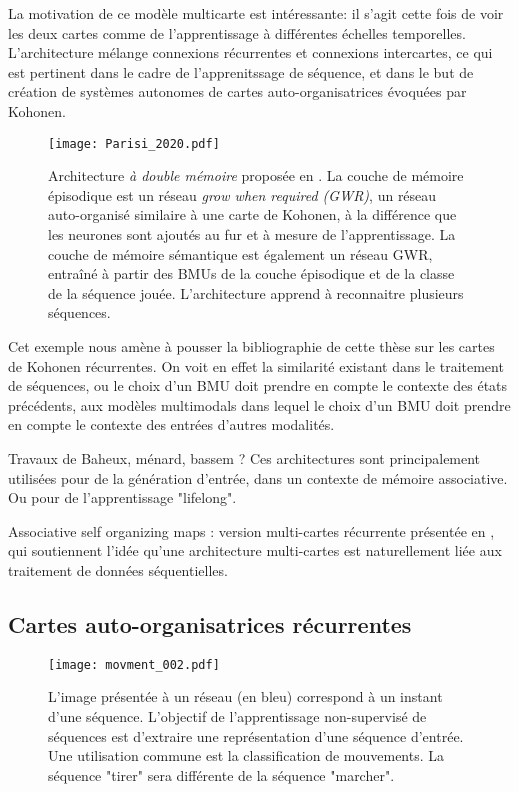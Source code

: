 \documentclass[../main]{subfiles}
\begin{document}
La motivation de ce modèle multicarte est intéressante: il s'agit cette fois de voir les deux cartes comme de l'apprentissage à différentes échelles temporelles. L'architecture mélange connexions récurrentes et connexions intercartes, ce qui est pertinent dans le cadre de l'apprenitssage de séquence, et dans le but de création de systèmes autonomes de cartes auto-organisatrices évoquées par Kohonen.


\begin{figure}
    \centering
    \texttt{[image: Parisi\_2020.pdf]}
    \caption{Architecture \emph{à double mémoire} proposée en \cite{parisiLL}. La couche de mémoire épisodique est un réseau \emph{grow when required (GWR)}, un réseau auto-organisé similaire à une carte de Kohonen, à la différence que les neurones sont ajoutés au fur et à mesure de l'apprentissage. La couche de mémoire sémantique est également un réseau GWR, entraîné à partir des BMUs de la couche épisodique et de la classe de la séquence jouée. L'architecture apprend à reconnaitre plusieurs séquences.\label{fig:gdm_parisi}}
\end{figure}

Cet exemple nous amène à pousser la bibliographie de cette thèse sur les cartes de Kohonen récurrentes. On voit en effet la similarité existant dans le traitement de séquences, ou le choix d'un BMU doit prendre en compte le contexte des états précédents, aux modèles multimodals dans lequel le choix d'un BMU doit prendre en compte le contexte des entrées d'autres modalités.

Travaux de Baheux, ménard, bassem ? 
Ces architectures sont principalement utilisées pour de la génération d'entrée, dans un contexte de mémoire associative. Ou pour de l'apprentissage "lifelong".

Associative self organizing maps : version multi-cartes récurrente présentée en \cite{Buonamente2015DiscriminatingAS}, qui soutiennent l'idée qu'une architecture multi-cartes est naturellement liée aux traitement de données séquentielles.

\subsection{Cartes auto-organisatrices récurrentes}
\begin{figure}
   \centering\texttt{[image: movment\_002.pdf]}
   \caption{L'image présentée à un réseau (en bleu) correspond à un instant d'une séquence. L'objectif de l'apprentissage non-supervisé de séquences est d'extraire une représentation d'une séquence d'entrée. Une utilisation commune est la classification de mouvements. La séquence "tirer" sera différente de la séquence "marcher".\label{fig:mouvement}}
\end{figure}
\end{document}
